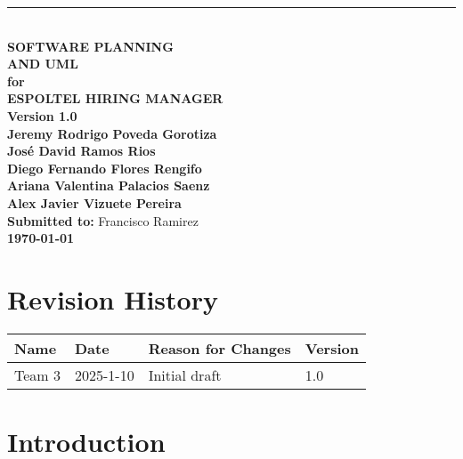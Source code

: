 \documentclass{scrreprt}
\date{November 14, 2024}
\def\myversion{1.0 }
\begin{document}
\begin{titlepage}
    \begin{flushright}
        \rule{16cm}{1.5pt} \\[1cm]
        {\Huge\bfseries SOFTWARE PLANNING\\ AND UML}\\[1cm]
        {\LARGE\bfseries for}\\[1cm]
        {\Huge\textbf{ESPOLTEL HIRING MANAGER}}\\[2cm]
        {\Large\textbf{Version \myversion}}\\[1.5cm]
        
        {\Large\textbf{Jeremy Rodrigo Poveda Gorotiza}\\
        \textbf{José David Ramos Rios}\\
        \textbf{Diego Fernando Flores Rengifo}\\
        \textbf{Ariana Valentina Palacios Saenz}\\
        \textbf{Alex Javier Vizuete Pereira}}\\[1.5cm]
        
        {\Large\textbf{Submitted to:} Francisco Ramirez}\\[1.5cm]
        {\Large\textbf{\today}}
    \end{flushright}
    \vfill
\end{titlepage}

\chapter*{Revision History}
\setcounter{page}{1}
\begin{center}
	\begin{tabular}{@{} l l p{6.5cm} l @{}}
		\toprule
		\textbf{Name}    & \textbf{Date}   & \textbf{Reason for Changes} & \textbf{Version} \\ 
		\midrule
		Team 3           & 2025-1-10      & Initial draft               & 1.0              \\
		\bottomrule
	\end{tabular}
\end{center}

\tableofcontents

\listoffigures
\listoftables



\chapter{Introduction}
\end{document}
